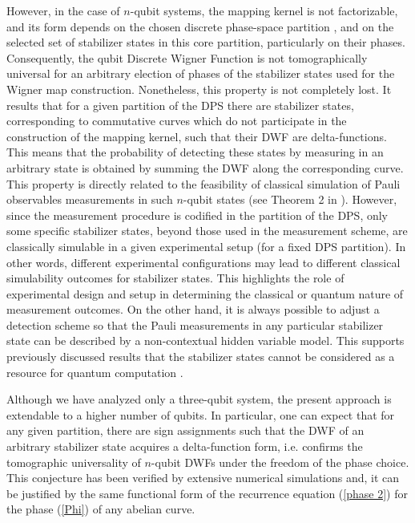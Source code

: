 \documentclass[quantumrep,article,submit,pdftex,moreauthors]{Definitions/mdpi}
\begin{document}
However, in the case of $n$-qubit systems, the mapping kernel is not
factorizable, and its form depends on the chosen discrete phase-space partition
\cite{Bjork2007}, and on the selected set of stabilizer states in this core
partition, particularly on their phases. Consequently, the qubit Discrete Wigner
Function is not tomographically universal for an arbitrary election of phases of
the stabilizer states used for the Wigner map construction. Nonetheless, this
property is not completely lost. It results that for a given partition of the
DPS there are stabilizer states, corresponding to commutative curves which do
not participate in the construction of the mapping kernel, such that their DWF
are delta-functions.  This means that the probability of detecting these states
by measuring in an arbitrary state is obtained by summing the DWF along the
corresponding curve. This property is directly related to the feasibility of
classical simulation of Pauli observables measurements in such $n$-qubit states
(see Theorem 2 in \cite{Raus17}). However, since the measurement procedure is
codified in the partition of the DPS, only some specific stabilizer states,
beyond those used in the measurement scheme, are classically simulable in a
given experimental setup (for a fixed DPS partition). In other words, different
experimental configurations may lead to different classical simulability
outcomes for stabilizer states. This highlights the role of experimental design
and setup in determining the classical or quantum nature of measurement
outcomes. On the other hand, it is always possible to adjust a detection scheme
so that the Pauli measurements in any particular stabilizer state can be
described by a non-contextual hidden variable model.  This supports previously
discussed results \cite{Raus17,contextMagic} that the stabilizer states cannot
be considered as a resource for quantum computation \cite{gottKnill}.

Although we have analyzed only a three-qubit system, the present approach is
extendable to a higher number of qubits. In particular, one can expect that for
any given partition, there are sign assignments such that the DWF of an
arbitrary stabilizer state acquires a delta-function form, i.e. confirms the
tomographic universality of $n$-qubit DWFs under the freedom of the phase
choice. This conjecture has been verified by extensive numerical simulations
and, it can be justified by the same functional form of the recurrence equation
(\ref{phase 2}) for the phase (\ref{Phi}) of any abelian curve.
\end{document}
